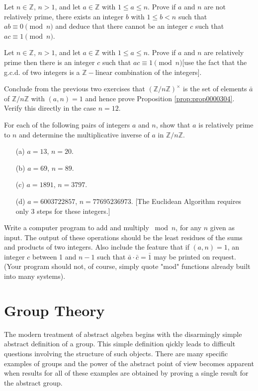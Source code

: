 \documentclass[cn,11pt,chinese]{elegantbook}
\numberwithin{equation}{section}
\begin{document}
\begin{problemset}
\item Let $n \in \mathbb{Z}$, $n > 1$, and let $a \in \mathbb{Z}$ with $1 \le a \le n$. Prove if $a$ and $n$ are not relatively prime, there exists an integer $b$ with $1 \le b < n$ such that $ab \equiv 0 \pmod{n}$ and deduce that there cannot be an integer $c$ such that $ac \equiv 1 \pmod{n}$.

\item Let $n \in \mathbb{Z}$, $n > 1$, and let $a \in \mathbb{Z}$ with $1 \le a \le n$. Prove if $a$ and $n$ are relatively prime then there is an integer $c$ such that $ac \equiv 1 \pmod{n}$[use the fact that the g.c.d. of two integers is a $\mathbb{Z}-$linear combination of the integers].

\item Conclude from the previous two exercises that $(\mathbb{Z}/n\mathbb{Z})^{\times}$ is the set of elements $\bar{a}$ of $\mathbb{Z}/n\mathbb{Z}$ with $(a, n)=1$ and hence prove Proposition \ref{prop:prop0000304}. Verify this directly in the case $n = 12$.

\item For each of the following pairs of integers $a$ and $n$, show that $a$ is relatively prime to $n$ and determine the multiplicative inverse of $a$ in $\mathbb{Z}/n\mathbb{Z}$.
\begin{enumerate}
\item[(a)] $a = 13$, $n = 20$.
\item[(b)] $a = 69$, $n = 89$.
\item[(c)] $a = 1891$, $n = 3797$.
\item[(d)] $a = 6003722857$, $n = 77695236973$. [The Euclidean Algorithm requires only 3 steps for these integers.]
\end{enumerate}

\item Write a computer program to add and multiply $\bmod{n}$, for any $n$ given as input. The output of these operations should be the least residues of the sums and products of two integers. Also include the feature that if $(a, n) = 1$, an integer $c$ between 1 and $n-1$ such that $\bar{a} \cdot \bar{c} = \bar{1}$ may be printed on request. (Your program should not, of course, simply quote "mod" functions already built into many systems).

\end{problemset}

\part{Group Theory}
The modern treatment of abstract algebra begins with the disarmingly simple abstract definition of a group. This simple definition qickly leads to difficult questions involving the structure of such objects. There are many specific examples of groups and the power of the abstract point of view becomes apparent when results for all of these examples are obtained by proving a single result for the abstract group.
\end{document}
